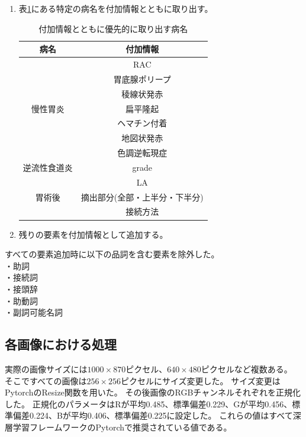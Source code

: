\begin{enumerate}
\begin{table}[htbp]
        \end{table}
    \item 表\ref{tb:nl4}にある特定の病名を付加情報とともに取り出す。
        \begin{table}[htbp]
            \caption[]{付加情報とともに優先的に取り出す病名}
            \label{tb:nl4}
            \centering
            \normalsize
            \begin{tabular}{c|c} \hline
                病名 & 付加情報 \\ \hline \hline
                         & RAC \\ \cline{2-2}
                         & 胃底腺ポリープ \\ \cline{2-2}
                         & 稜線状発赤 \\ \cline{2-2}
                慢性胃炎 & 扁平隆起 \\ \cline{2-2}
                         & ヘマチン付着 \\ \cline{2-2}
                         & 地図状発赤 \\ \cline{2-2}
                         & 色調逆転現症 \\ \hline
                逆流性食道炎 & grade \\ \cline{2-2}
                             & LA \\ \hline
                胃術後 & 摘出部分(全部・上半分・下半分) \\ \cline{2-2}
                       & 接続方法 \\ \hline
            \end{tabular}
        \end{table}
    \item 残りの要素を付加情報として追加する。
\end{enumerate}
すべての要素追加時に以下の品詞を含む要素を除外した。 \\
    ・助詞 \\
    ・接続詞 \\
    ・接頭辞 \\
    ・助動詞 \\
    ・副詞可能名詞

\subsection{各画像における処理}
実際の画像サイズには$1000 \times 870$ピクセル、$640 \times 480$ピクセルなど複数ある。
そこですべての画像は$256 \times 256$ピクセルにサイズ変更した。
サイズ変更はPytorch\cite{Pytorch}のResize関数を用いた。
その後画像のRGBチャンネルそれぞれを正規化した。
正規化のパラメータはRが平均0.485、標準偏差0.229、Gが平均0.456、標準偏差0.224、Bが平均0.406、標準偏差0.225に設定した。
これらの値はすべて深層学習フレームワークのPytorch\cite{Pytorch}で推奨されている値である。
